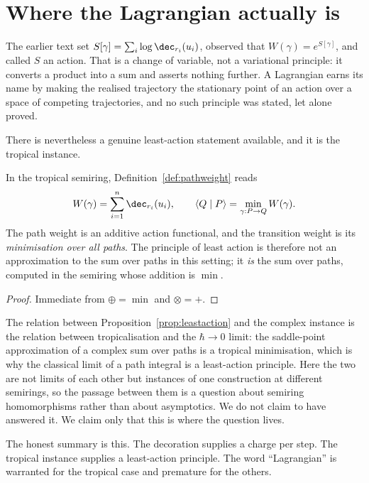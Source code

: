 \section{Where the Lagrangian actually is}

The earlier text set $S[\gamma] = \sum_i \log \dec_{r_i}(u_i)$, observed
that $W(\gamma) = e^{S[\gamma]}$, and called $S$ an action.  That is a
change of variable, not a variational principle: it converts a product
into a sum and asserts nothing further.  A Lagrangian earns its name by
making the realised trajectory the stationary point of an action over a
space of competing trajectories, and no such principle was stated, let
alone proved.

There is nevertheless a genuine least-action statement available, and it
is the tropical instance.

\begin{proposition}
\label{prop:leastaction}
In the tropical semiring, Definition~\ref{def:pathweight} reads
\[
  W(\gamma) = \sum_{i=1}^{n} \dec_{r_i}(u_i),
  \qquad
  \langle Q \mid P \rangle = \min_{\gamma : P \to Q} W(\gamma).
\]
The path weight is an additive action functional, and the transition
weight is its \emph{minimisation over all paths}.  The principle of least
action is therefore not an approximation to the sum over paths in this
setting; it \emph{is} the sum over paths, computed in the semiring whose
addition is $\min$.
\end{proposition}

\begin{proof}
Immediate from $\oplus = \min$ and $\otimes = +$.
\end{proof}

\begin{remark}
The relation between Proposition~\ref{prop:leastaction} and the complex
instance is the relation between tropicalisation and the $\hbar \to 0$
limit: the saddle-point approximation of a complex sum over paths is a
tropical minimisation, which is why the classical limit of a path
integral is a least-action principle.  Here the two are not limits of
each other but instances of one construction at different semirings, so
the passage between them is a question about semiring homomorphisms
rather than about asymptotics.  We do not claim to have answered it.  We
claim only that this is where the question lives.
\end{remark}

The honest summary is this.  The decoration supplies a charge per step.
The tropical instance supplies a least-action principle.  The word
``Lagrangian'' is warranted for the tropical case and premature for the
others.

